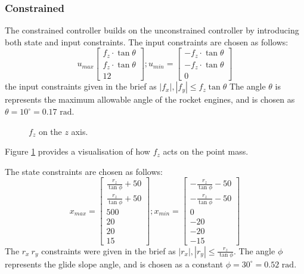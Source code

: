 \documentclass[conference, tikz]{IEEEtran}
\begin{document}
\subsubsection{Constrained}
The constrained controller builds on the unconstrained controller by introducing both state and input constraints. 
The input constraints are chosen as follows:
\[
    u_{max}
    \begin{bmatrix}
    f_z\cdot\tan{\theta}\\
    f_z\cdot\tan{\theta}\\
    12
    \end{bmatrix}
    ;
    u_{min} = 
    \begin{bmatrix}
        -f_z\cdot\tan{\theta}\\
        -f_z\cdot\tan{\theta}\\
        0
    \end{bmatrix}
\]  
the input constraints given in the brief as $|f_x|, |f_y| \le f_z \tan{\theta} {}$
The angle $\theta$ is represents the maximum allowable angle of the rocket engines, and is chosen as $\theta = 10 ^\circ = 0.17\text{ rad}$.

\begin{figure}[H]
\centering
{}
\caption{$f_z$ on the $z$ axis.} \label{tikz:axes}
\end{figure}

Figure \ref{tikz:axes} provides a visualisation of how $f_z$ acts on the point mass. 

The state constraints are chosen as follows:
\[
    x_{max} = 
    \begin{bmatrix}
        \frac{r_z}{\tan{\phi}}+50\\
        \frac{r_z}{\tan{\phi}}+50\\
        500\\
        20\\
        20\\
        15
    \end{bmatrix}
    ;
    x_{min} = 
    \begin{bmatrix}
        -\frac{r_z}{\tan{\phi}}-50\\
        -\frac{r_z}{\tan{\phi}}-50\\
        0\\
        -20\\
        -20\\
        -15
    \end{bmatrix}
\]
The $r_x \ r_y$ constraints were given in the brief as $|r_x|, |r_y| \le \frac{r_z}{\tan{\phi}}$.
The angle $\phi$ represents the glide slope angle, and is chosen as a constant $\phi = 30^\circ = 0.52\text{ rad}$.
\end{document}
